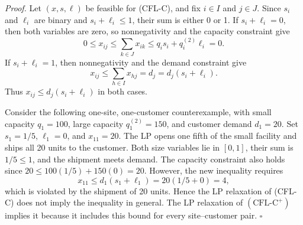 \documentclass[11pt]{article}
\theoremstyle{definition}
\begin{document}
\begin{proofbox}
\emph{Proof.}
Let $(x,s,\ell)$ be feasible for (CFL-C), and fix $i\in I$ and
$j\in J$. Since $s_i$ and $\ell_i$ are binary and $s_i+\ell_i\le 1$,
their sum is either 0 or 1. If $s_i+\ell_i=0$, then both
variables are zero, so nonnegativity and the capacity constraint give
\[
    0 \le x_{ij} \le \sum_{k\in J} x_{ik}
    \le q_i s_i + q_i^{(2)}\ell_i = 0.
\]
If $s_i+\ell_i=1$, then nonnegativity and the demand constraint give
\[
    x_{ij} \le \sum_{h\in I} x_{hj}
    = d_j = d_j(s_i+\ell_i).
\]
Thus $x_{ij}\le d_j(s_i+\ell_i)$ in both cases.

Consider the following one-site, one-customer counterexample, with small capacity
$q_1=100$, large capacity $q_1^{(2)}=150$, and customer demand
$d_1=20$. Set $s_1=1/5$, $\ell_1=0$, and $x_{11}=20$. The LP
opens one fifth of the small facility and ships all 20 units to
the customer. Both size variables lie in $[0,1]$, their sum is
$1/5\le 1$, and the shipment meets demand. The capacity constraint
also holds since $20\le 100(1/5)+150(0)=20$. However, the new
inequality requires
\[
    x_{11} \le d_1(s_1+\ell_1) = 20(1/5+0) = 4,
\]
which is violated by the shipment of 20 units. Hence the LP
relaxation of (CFL-C) does not imply the inequality in general.
The LP relaxation of $(\mathrm{CFL\text{-}C}^{+})$ implies it
because it includes this bound for every site--customer pair.
\hfill$\square$
\end{proofbox}
\end{document}
